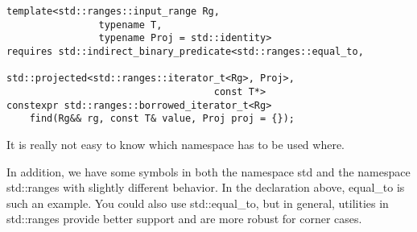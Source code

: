 \begin{itemize}
\begin{lstlisting}[style=styleCXX]
template<std::ranges::input_range Rg,
				typename T,
				typename Proj = std::identity>
requires std::indirect_binary_predicate<std::ranges::equal_to,
									std::projected<std::ranges::iterator_t<Rg>, Proj>,
									const T*>
constexpr std::ranges::borrowed_iterator_t<Rg>
	find(Rg&& rg, const T& value, Proj proj = {});
\end{lstlisting}

It is really not easy to know which namespace has to be used where.

In addition, we have some symbols in both the namespace std and the namespace std::ranges with slightly different behavior. In the declaration above, equal\_to is such an example. You could also use std::equal\_to, but in general, utilities in std::ranges provide better support and are more robust for corner cases.
\end{itemize}















